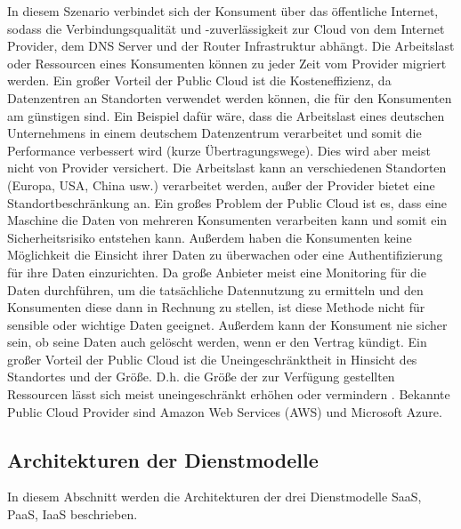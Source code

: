 In diesem Szenario verbindet sich der Konsument über das öffentliche Internet, sodass die Verbindungsqualität und -zuverlässigkeit zur Cloud
von dem Internet Provider, dem DNS Server und der Router Infrastruktur abhängt. Die Arbeitslast oder Ressourcen eines Konsumenten können zu jeder Zeit
vom Provider migriert werden. Ein großer Vorteil der Public Cloud ist die Kosteneffizienz, da Datenzentren an Standorten verwendet werden können, die für den Konsumenten am günstigen sind.
Ein Beispiel dafür wäre, dass die Arbeitslast eines deutschen Unternehmens in einem deutschem Datenzentrum verarbeitet und somit die Performance verbessert wird (kurze Übertragungswege).
Dies wird aber meist nicht von Provider versichert. Die Arbeitslast kann an verschiedenen Standorten (Europa, USA, China usw.) verarbeitet werden, außer der Provider bietet eine
Standortbeschränkung an. Ein großes Problem der Public Cloud ist es, dass eine Maschine die Daten von mehreren Konsumenten verarbeiten kann und somit ein Sicherheitsrisiko entstehen kann.
Außerdem haben die Konsumenten keine Möglichkeit die Einsicht ihrer Daten zu überwachen oder eine Authentifizierung für ihre Daten einzurichten. Da große Anbieter meist eine Monitoring für die
Daten durchführen, um die tatsächliche Datennutzung zu ermitteln und den Konsumenten diese dann in Rechnung zu stellen, ist diese Methode nicht für sensible oder wichtige Daten geeignet.
Außerdem kann der Konsument nie sicher sein, ob seine Daten auch gelöscht werden, wenn er den Vertrag kündigt. 
Ein großer Vorteil der Public Cloud ist die Uneingeschränktheit in Hinsicht des Standortes und der Größe. D.h. die Größe der zur Verfügung gestellten Ressourcen lässt sich 
meist \glqq uneingeschränkt\grqq{} erhöhen oder vermindern \cite{Badger}.
Bekannte Public Cloud Provider sind Amazon Web Services (AWS) und Microsoft Azure. 

\subsection{Architekturen der Dienstmodelle}
In diesem Abschnitt werden die Architekturen der drei Dienstmodelle SaaS, PaaS, IaaS beschrieben.

